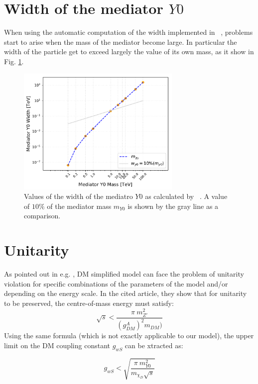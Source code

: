 \documentclass[epj,nopacs,fleqn]{svjour}
\begin{document}
\section{Width of the mediator $Y0$ }
When using the automatic computation of the width implemented in \MG~, problems start to arise when the mass of the mediator become large. In particular the width of the particle get to exceed largely the value of its own mass, as it show in Fig. \ref{width}.

\begin{figure}[!h]
	\centering
	\includegraphics[width=0.7\textwidth]{Fig/Widths_check.pdf}

	\caption{Values of the width of the mediatro $Y0$ as calculated by \MG~. A value of $10\%$ of the mediator mass $m_{Y0}$ is shown by the gray line as a comparison.}
	\label{width}
\end{figure}


\clearpage
\section{Unitarity}

As pointed out in e.g. \cite{Kahlhoefer:2015bea}, DM simplified model can face the problem of unitarity violation for specific combinations of the parameters of the model and/or depending on the energy scale. In the cited article, they show that for unitarity to be preserved, the centre-of-mass energy must satisfy:
\begin{equation}
\sqrt{s} < \frac{\pi \ m^2 _{Z'}}{(g^A_{DM})^2 m_{DM})} 
\end{equation}
Using the same formula (which is not exactly applicable to our model), the upper limit on the DM coupling constant $g_{wS}$ can be xtracted as:

\begin{equation}
g_{wS} < \sqrt{ \frac{\pi \ m^2 _{Y0}}{ m_{\chi_D} \sqrt{s} }  } 
\end{equation}
\end{document}
